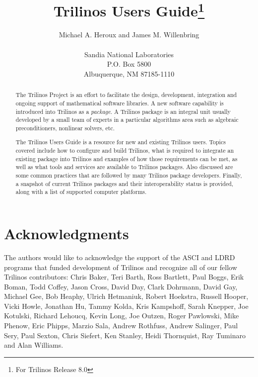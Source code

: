 \documentclass[12pt,relax]{TrilinosUserGuide}
\title{Trilinos Users Guide\footnote{For Trilinos Release 8.0}}
\author{
Michael A. Heroux and James M. Willenbring \\
 \\
Sandia National Laboratories \\
P.O. Box 5800 \\
Albuquerque, NM 87185-1110
}
\date{} %
\begin{document}
\maketitle
\begin{abstract}

The Trilinos Project is an effort to facilitate the design, development,
integration and ongoing support of mathematical software libraries.
A new software capability is introduced into Trilinos as a {\it
package}.  A Trilinos package is an integral unit usually developed by
a small team of experts in a particular algorithms area such as
algebraic preconditioners, nonlinear solvers, etc.

The Trilinos Users Guide is a resource for new and existing
Trilinos users.  Topics covered include how to configure and
build Trilinos, what is required to integrate an existing package into Trilinos
and examples of how those requirements can be met, as well as what
tools and services are
available to Trilinos packages.  Also discussed are some common practices that
are followed by many Trilinos package developers.  Finally, a snapshot
of current Trilinos packages and their interoperability status
is provided, along with a list of supported computer platforms.

\end{abstract}

\clearpage

\section*{Acknowledgments}
The authors would like to acknowledge the support of the ASCI and LDRD
programs that funded development of Trilinos and recognize all of our fellow
Trilinos contributors: Chris Baker, Teri Barth, Ross Bartlett, Paul Boggs, Erik 
Boman, Todd Coffey, Jason Cross, David Day, Clark Dohrmann, David Gay,
Michael Gee, Bob Heaphy, Ulrich Hetmaniuk, Robert Hoekstra, Russell Hooper,
Vicki Howle, Jonathan Hu, Tammy Kolda, Kris Kampshoff, Sarah Knepper, Joe 
Kotulski, Richard Lehoucq, Kevin Long, Joe Outzen, Roger Pawlowski, Mike Phenow, 
Eric Phipps, Marzio Sala, Andrew Rothfuss, Andrew Salinger, Paul Sery, Paul 
Sexton, Chris Siefert, Ken Stanley, Heidi Thornquist, Ray Tuminaro and Alan Williams.

\clearpage
\tableofcontents
\listoffigures
\listoftables

\clearpage

\end{document}
